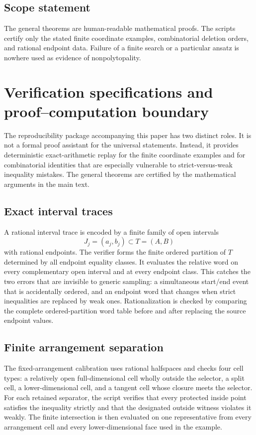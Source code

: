 \subsection{Scope statement}
The general theorems are human-readable mathematical proofs.  The scripts certify only the stated finite coordinate examples, combinatorial deletion orders, and rational endpoint data.  Failure of a finite search or a particular ansatz is nowhere used as evidence of nonpolytopality.

\section{Verification specifications and proof--computation boundary}
\label{app:verification}

The reproducibility package accompanying this paper has two distinct roles.  It is not a formal proof assistant for the universal statements.  Instead, it provides deterministic exact-arithmetic replay for the finite coordinate examples and for combinatorial identities that are especially vulnerable to strict-versus-weak inequality mistakes.  The general theorems are certified by the mathematical arguments in the main text.

\subsection{Exact interval traces}

A rational interval trace is encoded by a finite family of open intervals
\[
 J_j=(a_j,b_j)\subset T=(A,B)
\]
with rational endpoints.  The verifier forms the finite ordered partition of $T$ determined by all endpoint equality classes.  It evaluates the relative word on every complementary open interval and at every endpoint class.  This catches the two errors that are invisible to generic sampling: a simultaneous start/end event that is accidentally ordered, and an endpoint word that changes when strict inequalities are replaced by weak ones.  Rationalization is checked by comparing the complete ordered-partition word table before and after replacing the source endpoint values.

\subsection{Finite arrangement separation}

The fixed-arrangement calibration uses rational halfspaces and checks four cell types: a relatively open full-dimensional cell wholly outside the selector, a split cell, a lower-dimensional cell, and a tangent cell whose closure meets the selector.  For each retained separator, the script verifies that every protected inside point satisfies the inequality strictly and that the designated outside witness violates it weakly.  The finite intersection is then evaluated on one representative from every arrangement cell and every lower-dimensional face used in the example.


